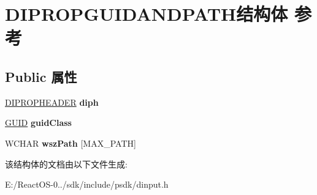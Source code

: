 \hypertarget{struct_d_i_p_r_o_p_g_u_i_d_a_n_d_p_a_t_h}{}\section{D\+I\+P\+R\+O\+P\+G\+U\+I\+D\+A\+N\+D\+P\+A\+T\+H结构体 参考}
\label{struct_d_i_p_r_o_p_g_u_i_d_a_n_d_p_a_t_h}
\subsection*{Public 属性}
\begin{DoxyCompactItemize}
\item 
\mbox{\label{struct_d_i_p_r_o_p_g_u_i_d_a_n_d_p_a_t_h_a530542b2b1714295053dc827b8cecfdb}} 
\hyperlink{struct_d_i_p_r_o_p_h_e_a_d_e_r}{D\+I\+P\+R\+O\+P\+H\+E\+A\+D\+ER} {\bfseries diph}
\item 
\mbox{\label{struct_d_i_p_r_o_p_g_u_i_d_a_n_d_p_a_t_h_aeb66a81b5887ee112e59b44c5403eee8}} 
\hyperlink{interface_g_u_i_d}{G\+U\+ID} {\bfseries guid\+Class}
\item 
\mbox{\label{struct_d_i_p_r_o_p_g_u_i_d_a_n_d_p_a_t_h_a33104322e09953d31a7c9f5570fc0e70}} 
W\+C\+H\+AR {\bfseries wsz\+Path} \mbox{[}M\+A\+X\+\_\+\+P\+A\+TH\mbox{]}
\end{DoxyCompactItemize}


该结构体的文档由以下文件生成\+:\begin{DoxyCompactItemize}
\item 
E\+:/\+React\+O\+S-\/0../sdk/include/psdk/dinput.\+h\end{DoxyCompactItemize}
